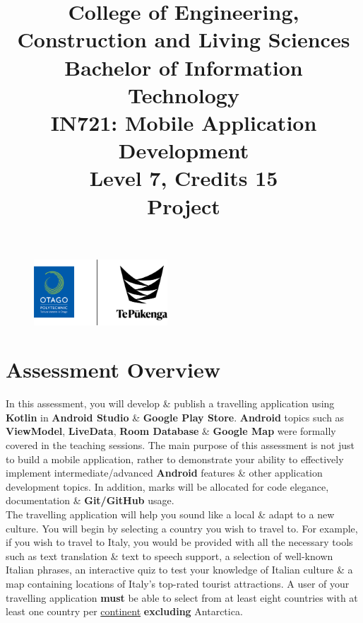 \documentclass{article}
\author{}
\begin{document}
\begin{figure}
	\centering
	\includegraphics[width=50mm]{../../resources/img/logo.png}
\end{figure}

\title{College of Engineering, Construction and Living Sciences\\Bachelor of Information Technology\\IN721: Mobile Application Development\\Level 7, Credits 15\\\textbf{Project}}
\date{}
\maketitle

\section*{Assessment Overview}
In this assessment, you will develop \& publish a travelling application using \textbf{Kotlin} in \textbf{Android Studio} \& \textbf{Google Play Store}. \textbf{Android} topics such as \textbf{ViewModel}, \textbf{LiveData}, \textbf{Room Database} \& \textbf{Google Map} were formally covered in the teaching sessions. The main purpose of this assessment is not just to build a mobile application, rather to demonstrate your ability to effectively implement intermediate/advanced \textbf{Android} features \& other application development topics. In addition, marks will be allocated for code elegance, documentation \& \textbf{Git/GitHub} usage. \\

The travelling application will help you sound like a local \& adapt to a new culture. You will begin by selecting a country you wish to travel to. For example, if you wish to travel to Italy, you would be provided with all the necessary tools such as text translation \& text to speech support, a selection of well-known Italian phrases, an interactive quiz to test your knowledge of Italian culture \& a map containing locations of Italy's top-rated tourist attractions. A user of your travelling application \textbf{must} be able to select from at least eight countries with at least one country per \href{https://www.worldometers.info/geography/7-continents/}{continent} \textbf{excluding} Antarctica. 
\end{document}
